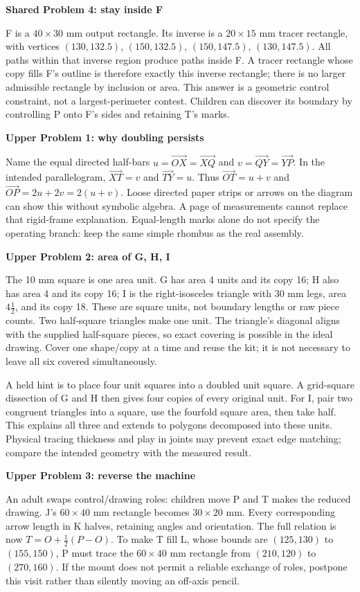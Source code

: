 \documentclass[11pt,letterpaper]{article}
\newcommand{\heading}[1]{\par\vspace{4pt}{\large\bfseries #1}\par}
\newcommand{\sub}[1]{\par\textbf{#1}\par}
\begin{document}
\sub{Shared Problem 4: stay inside F}
F is a $40\times30$ mm output rectangle. Its inverse is a $20\times15$ mm tracer rectangle, with vertices $(130,132.5)$, $(150,132.5)$, $(150,147.5)$, $(130,147.5)$. All paths within that inverse region produce paths inside F. A tracer rectangle whose copy fills F's outline is therefore exactly this inverse rectangle; there is no larger admissible rectangle by inclusion or area. This answer is a geometric control constraint, not a largest-perimeter contest. Children can discover its boundary by controlling P onto F's sides and retaining T's marks.
\newpage
\heading{Upper packet: explanation and return visits}
\sub{Upper Problem 1: why doubling persists}
Name the equal directed half-bars $u=\overrightarrow{OX}=\overrightarrow{XQ}$ and $v=\overrightarrow{QY}=\overrightarrow{YP}$. In the intended parallelogram, $\overrightarrow{XT}=v$ and $\overrightarrow{TY}=u$. Thus $\overrightarrow{OT}=u+v$ and $\overrightarrow{OP}=2u+2v=2(u+v)$. Loose directed paper strips or arrows on the diagram can show this without symbolic algebra. A page of measurements cannot replace that rigid-frame explanation. Equal-length marks alone do not specify the operating branch: keep the same simple rhombus as the real assembly.

\sub{Upper Problem 2: area of G, H, I}
The 10 mm square is one area unit. G has area 4 units and its copy 16; H also has area 4 and its copy 16; I is the right-isosceles triangle with 30 mm legs, area $4\frac12$, and its copy 18. These are square units, not boundary lengths or raw piece counts. Two half-square triangles make one unit. The triangle's diagonal aligns with the supplied half-square pieces, so exact covering is possible in the ideal drawing. Cover one shape/copy at a time and reuse the kit; it is not necessary to leave all six covered simultaneously.

A held hint is to place four unit squares into a doubled unit square. A grid-square dissection of G and H then gives four copies of every original unit. For I, pair two congruent triangles into a square, use the fourfold square area, then take half. This explains all three and extends to polygons decomposed into these units. Physical tracing thickness and play in joints may prevent exact edge matching; compare the intended geometry with the measured result.

\sub{Upper Problem 3: reverse the machine}
An adult swaps control/drawing roles: children move P and T makes the reduced drawing. J's $60\times40$ mm rectangle becomes $30\times20$ mm. Every corresponding arrow length in K halves, retaining angles and orientation. The full relation is now $T=O+\frac12(P-O)$. To make T fill L, whose bounds are $(125,130)$ to $(155,150)$, P must trace the $60\times40$ mm rectangle from $(210,120)$ to $(270,160)$. If the mount does not permit a reliable exchange of roles, postpone this visit rather than silently moving an off-axis pencil.
\end{document}

